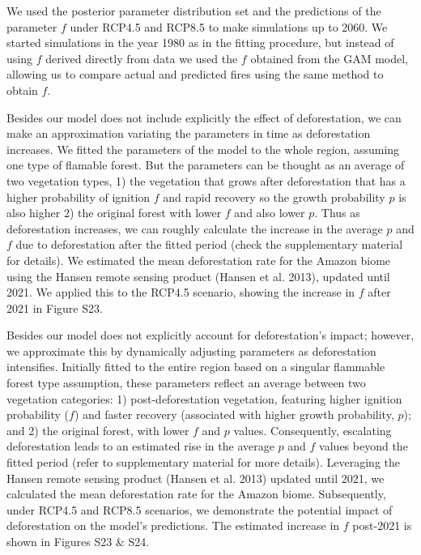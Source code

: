 \documentclass[
]{article}
\begin{document}
We used the posterior parameter distribution set and the predictions of
the parameter \(f\) under RCP4.5 and RCP8.5 to make simulations up to
2060. We started simulations in the year 1980 as in the fitting
procedure, but instead of using \(f\) derived directly from data we used
the \(f\) obtained from the GAM model, allowing us to compare actual and
predicted fires using the same method to obtain \(f\).

Besides our model does not include explicitly the effect of
deforestation, we can make an approximation variating the parameters in
time as deforestation increases. We fitted the parameters of the model
to the whole region, assuming one type of flamable forest. But the
parameters can be thought as an average of two vegetation types, 1) the
vegetation that grows after deforestation that has a higher probability
of ignition \(f\) and rapid recovery so the growth probability \(p\) is
also higher 2) the original forest with lower \(f\) and also lower
\(p\). Thus as deforestation increases, we can roughly calculate the
increase in the average \(p\) and \(f\) due to deforestation after the
fitted period (check the supplementary material for details). We
estimated the mean deforestation rate for the Amazon biome using the
Hansen remote sensing product (Hansen et al. 2013), updated until 2021.
We applied this to the RCP4.5 scenario, showing the increase in \(f\)
after 2021 in Figure S23.

Besides our model does not explicitly account for deforestation's
impact; however, we approximate this by dynamically adjusting parameters
as deforestation intensifies. Initially fitted to the entire region
based on a singular flammable forest type assumption, these parameters
reflect an average between two vegetation categories: 1)
post-deforestation vegetation, featuring higher ignition probability
(\(f\)) and faster recovery (associated with higher growth probability,
\(p\)); and 2) the original forest, with lower \(f\) and \(p\) values.
Consequently, escalating deforestation leads to an estimated rise in the
average \(p\) and \(f\) values beyond the fitted period (refer to
supplementary material for more details). Leveraging the Hansen remote
sensing product (Hansen et al. 2013) updated until 2021, we calculated
the mean deforestation rate for the Amazon biome. Subsequently, under
RCP4.5 and RCP8.5 scenarios, we demonstrate the potential impact of
deforestation on the model's predictions. The estimated increase in
\(f\) post-2021 is shown in Figures S23 \& S24.
\end{document}
